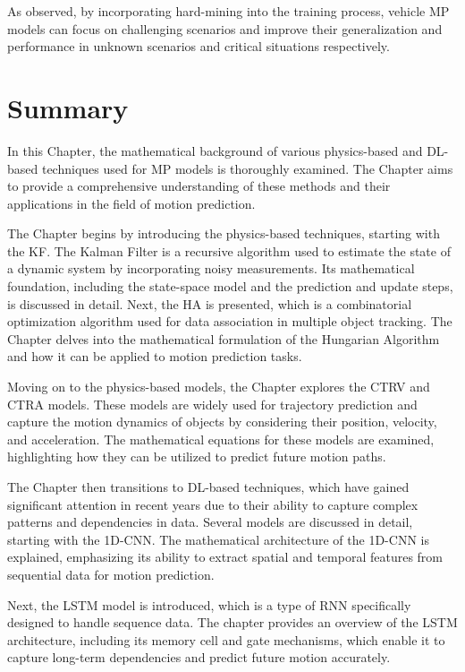 As observed, by incorporating hard-mining into the training process, vehicle \ac{MP} models can focus on challenging scenarios and improve their generalization and performance in unknown scenarios and critical situations respectively.

\section{Summary}
\label{sec:3_summary}

In this Chapter, the mathematical background of various physics-based and \ac{DL}-based techniques used for \ac{MP} models is thoroughly examined. The Chapter aims to provide a comprehensive understanding of these methods and their applications in the field of motion prediction.

The Chapter begins by introducing the physics-based techniques, starting with the \ac{KF}. The Kalman Filter is a recursive algorithm used to estimate the state of a dynamic system by incorporating noisy measurements. Its mathematical foundation, including the state-space model and the prediction and update steps, is discussed in detail. Next, the \ac{HA} is presented, which is a combinatorial optimization algorithm used for data association in multiple object tracking. The Chapter delves into the mathematical formulation of the Hungarian Algorithm and how it can be applied to motion prediction tasks.

Moving on to the physics-based models, the Chapter explores the \ac{CTRV} and \ac{CTRA} models. These models are widely used for trajectory prediction and capture the motion dynamics of objects by considering their position, velocity, and acceleration. The mathematical equations for these models are examined, highlighting how they can be utilized to predict future motion paths.

The Chapter then transitions to \ac{DL}-based techniques, which have gained significant attention in recent years due to their ability to capture complex patterns and dependencies in data. Several models are discussed in detail, starting with the 1D-\ac{CNN}. The mathematical architecture of the 1D-\ac{CNN} is explained, emphasizing its ability to extract spatial and temporal features from sequential data for motion prediction.

Next, the \ac{LSTM} model is introduced, which is a type of \ac{RNN} specifically designed to handle sequence data. The chapter provides an overview of the \ac{LSTM} architecture, including its memory cell and gate mechanisms, which enable it to capture long-term dependencies and predict future motion accurately.

